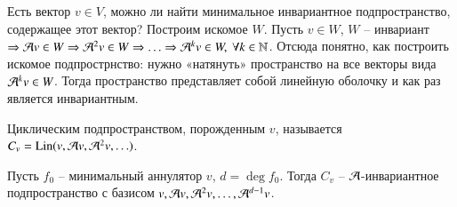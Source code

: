 \documentclass[main]{subfiles}
\begin{document}
Есть вектор $v \in V$, можно ли найти минимальное инвариантное подпространство, содержащее этот вектор? Построим искомое $W$. Пусть $v\in W$, $W$ -- инвариант $\Rightarrow \mathcal{A} v \in W \Rightarrow {\mathcal{A}}^2 v \in W \Rightarrow \ldots \Rightarrow  {\mathcal{A}}^k v \in W, \ \forall k \in \mathbb{N}$.
Отсюда понятно, как построить искомое подпрострнство: нужно «натянуть» пространство на все векторы вида ${\mathcal{A}}^k v \in W$. Тогда пространство представляет собой линейную оболочку и как раз является инвариантным.

\begin{definition} 
    Циклическим подпространством, порожденным $v$, называется $C_v = \operatorname{Lin}(v, \mathcal{A} v, {\mathcal{A}}^2 v, \ldots)$.
\end{definition}

\begin{proposition}
    Пусть $f_0$ -- минимальный аннулятор $v$, $d = \deg f_0$. Тогда $C_v$ -- $\mathcal{A}$-инвариантное подпространство с базисом
    $v, \mathcal{A} v, {\mathcal{A}}^2 v, \ldots, {\mathcal{A}}^{d-1} v$.
\end{proposition}
\end{document}
